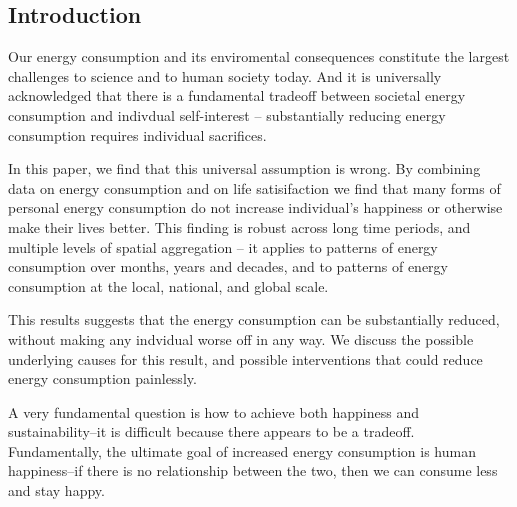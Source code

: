 \documentclass[10pt, letterpaper]{article}
\begin{document}
\begin{spacing}{1.4}



\section{Introduction}


Our energy consumption and  its enviromental consequences constitute the largest challenges to science and to human society today. And it is universally acknowledged that there is a fundamental tradeoff between societal energy consumption and indivdual self-interest -- substantially reducing energy consumption requires individual sacrifices. 


In this paper, we find that this universal assumption is wrong.  By combining data on energy consumption and on life satisifaction we find that  many forms of personal energy consumption do not increase individual's happiness or otherwise make their lives better. This finding is robust across long time periods, and multiple levels of spatial aggregation -- it applies to patterns of energy consumption over months, years and decades,  and to patterns of energy consumption at the local, national, and global scale.  

This results suggests that the energy consumption can be substantially reduced, without making any indvidual worse off in any way.  We discuss the possible underlying causes for this result, and  possible interventions that could reduce energy consumption painlessly.


 

A very fundamental question is how to achieve both happiness and
sustainability--it is difficult because there appears to be a tradeoff.
Fundamentally,
 the ultimate goal of increased energy consumption is human
 happiness--if there is no relationship between the two, then we can
 consume less and stay happy.


\end{spacing}
\end{document}
